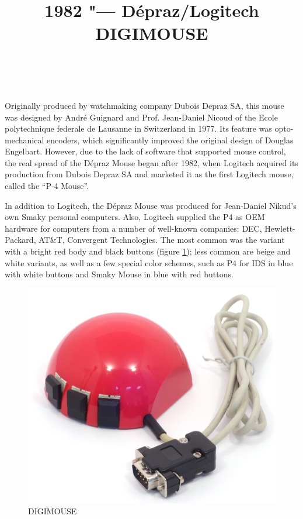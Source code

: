 \documentclass[11pt, a4paper]{article}
\begin{document}
\title{1982 "--- D\'epraz/Logitech DIGIMOUSE}
\date{}
\author{~}
\maketitle
{}
Originally produced by watchmaking company Dubois Depraz SA, this mouse was designed by Andr\'e Guignard and Prof. Jean-Daniel Nicoud of the Ecole polytechnique federale de Lausanne in Switzerland in 1977. Its feature was opto-mechanical encoders, which significantly improved the original design of Douglas Engelbart. However, due to the lack of software that supported mouse control, the real spread of the D\'epraz Mouse began after 1982, when Logitech acquired its production from Dubois Depraz SA and marketed it as the first Logitech mouse, called the ``P-4 Mouse''.

In addition to Logitech, the D\'epraz Mouse was produced for Jean-Daniel Nikud's own Smaky personal computers. Also, Logitech supplied the P4 as OEM hardware for computers from a number of well-known companies: DEC, Hewlett-Packard, AT\&T, Convergent Technologies. The most common was the variant with a bright red body and black buttons (figure \ref{fig:DIGIMOUSEP4Pic}); less common are beige and white variants, as well as a few special color schemes, such as P4 for IDS in blue with white buttons and Smaky Mouse in blue with red buttons.

\begin{figure}[h]
   \centering
    \includegraphics[scale=0.5]{1982_depraz_digimouse/pic_60.jpg}
    \caption{DIGIMOUSE}
    \label{fig:DIGIMOUSEP4Pic}
\end{figure}
\end{document}
